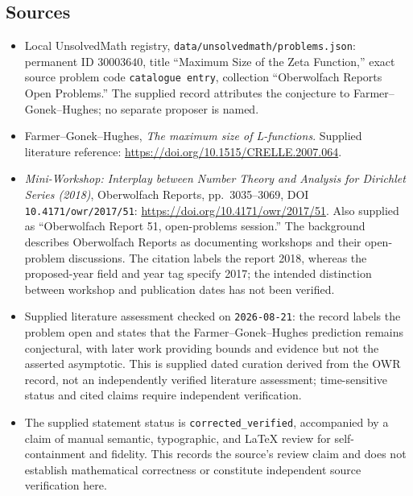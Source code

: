 \documentclass[11pt]{article}
\begin{document}
\subsection{Sources}
\begin{itemize}
\item Local UnsolvedMath registry, \texttt{data/unsolvedmath/problems.json}: permanent ID \(30003640\), title ``Maximum Size of the Zeta Function,'' exact source problem code \texttt{catalogue entry}, collection ``Oberwolfach Reports Open Problems.'' The supplied record attributes the conjecture to Farmer--Gonek--Hughes; no separate proposer is named.
\item Farmer--Gonek--Hughes, \emph{The maximum size of L-functions}. Supplied literature reference: \url{https://doi.org/10.1515/CRELLE.2007.064}.
\item \emph{Mini-Workshop: Interplay between Number Theory and Analysis for Dirichlet Series (2018)}, Oberwolfach Reports, pp.\ 3035--3069, DOI \texttt{10.4171/owr/2017/51}: \url{https://doi.org/10.4171/owr/2017/51}. Also supplied as ``Oberwolfach Report 51, open-problems session.'' The background describes Oberwolfach Reports as documenting workshops and their open-problem discussions. The citation labels the report 2018, whereas the proposed-year field and year tag specify 2017; the intended distinction between workshop and publication dates has not been verified.
\item Supplied literature assessment checked on \texttt{2026-08-21}: the record labels the problem open and states that the Farmer--Gonek--Hughes prediction remains conjectural, with later work providing bounds and evidence but not the asserted asymptotic. This is supplied dated curation derived from the OWR record, not an independently verified literature assessment; time-sensitive status and cited claims require independent verification.
\item The supplied statement status is \texttt{corrected\_verified}, accompanied by a claim of manual semantic, typographic, and LaTeX review for self-containment and fidelity. This records the source's review claim and does not establish mathematical correctness or constitute independent source verification here.
\end{itemize}
\end{document}
